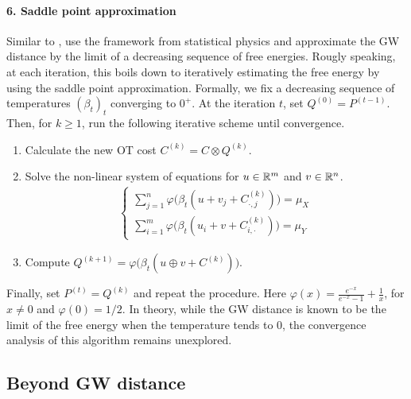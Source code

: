 \paragraph{6. Saddle point approximation} Similar to \citep{Koehl19},
\citep{Koehl23} use the framework from statistical physics and approximate the GW distance by
the limit of a decreasing sequence of free energies. Rougly speaking, at each iteration,
this boils down to iteratively estimating the free energy by using the saddle point approximation.
Formally, we fix a decreasing sequence of temperatures $(\beta_t)_t$ converging to $0^+$.
At the iteration $t$, set $Q^{(0)} = P^{(t-1)}$. Then, for $k \geq 1$,
run the following iterative scheme until convergence.
\begin{enumerate}
  \item Calculate the new OT cost $C^{(k)} = C \otimes Q^{(k)}$.
  \item Solve the non-linear system of equations for $u \in \mathbb R^m$ and $v \in \mathbb R^n$.
  \begin{align*}
    \begin{cases}
      \sum\limits_{j=1}^n \varphi \big( \beta_t (u + v_j + C^{(k)}_{\cdot, j}) \big) = \mu_X \\
      \sum\limits_{i=1}^m \varphi \big( \beta_t (u_i + v + C^{(k)}_{i, \cdot}) \big) = \mu_Y
    \end{cases}
  \end{align*}
  \item Compute $Q^{(k+1)} = \varphi \big( \beta_t (u \oplus v + C^{(k)}) \big)$.
\end{enumerate}
Finally, set $P^{(t)} = Q^{(k)}$ and repeat the procedure.
Here $\varphi(x) = \frac{e^{-x}}{e^{-x} - 1} + \frac{1}{x}$, for $x \neq 0$ and $\varphi(0) = 1/2$.
In theory, while the GW distance is known to be the limit of the free energy when
the temperature tends to $0$, the convergence analysis of this algorithm remains unexplored.

\subsection{Beyond GW distance}

